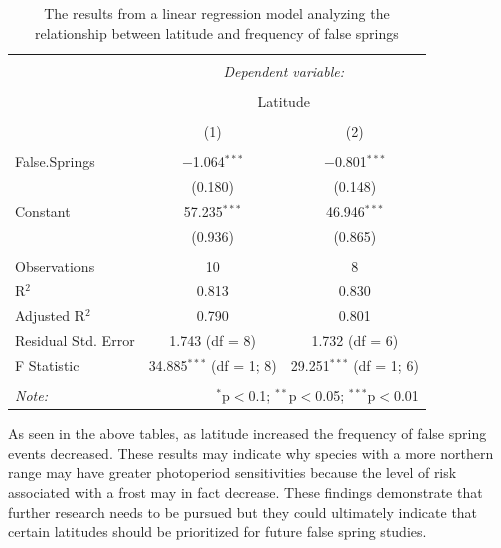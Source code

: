 \documentclass{article}\usepackage[]{graphicx}\usepackage[]{color}
\begin{document}
\begin{table}[!htbp] \centering 
  \caption{The results from a linear regression model analyzing the relationship between latitude and frequency of false springs} 
  \label{} 
\begin{tabular}{@{\extracolsep{5pt}}lcc} 
\\[-1.8ex]\hline 
\hline \\[-1.8ex] 
 & \multicolumn{2}{c}{\textit{Dependent variable:}} \\ 
\cline{2-3} 
\\[-1.8ex] & \multicolumn{2}{c}{Latitude} \\ 
\\[-1.8ex] & (1) & (2)\\ 
\hline \\[-1.8ex] 
 False.Springs & $-$1.064$^{***}$ & $-$0.801$^{***}$ \\ 
  & (0.180) & (0.148) \\ 
  Constant & 57.235$^{***}$ & 46.946$^{***}$ \\ 
  & (0.936) & (0.865) \\ 
 \hline \\[-1.8ex] 
Observations & 10 & 8 \\ 
R$^{2}$ & 0.813 & 0.830 \\ 
Adjusted R$^{2}$ & 0.790 & 0.801 \\ 
Residual Std. Error & 1.743 (df = 8) & 1.732 (df = 6) \\ 
F Statistic & 34.885$^{***}$ (df = 1; 8) & 29.251$^{***}$ (df = 1; 6) \\ 
\hline 
\hline \\[-1.8ex] 
\textit{Note:}  & \multicolumn{2}{r}{$^{*}$p$<$0.1; $^{**}$p$<$0.05; $^{***}$p$<$0.01} \\ 
\end{tabular} 
\end{table} 


As seen in the above tables, as latitude increased the frequency of false spring events decreased. These results may indicate why species with a more northern range may have greater photoperiod sensitivities because the level of risk associated with a frost may in fact decrease. These findings demonstrate that further research needs to be pursued but they could ultimately indicate that certain latitudes should be prioritized for future false spring studies. 
\end{document}
